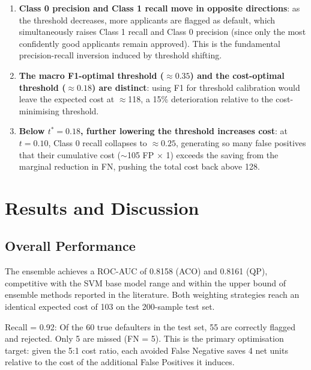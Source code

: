 \documentclass[12pt,a4paper]{article}
\begin{document}
\begin{enumerate}
    \item \textbf{Class 0 precision and Class 1 recall move in opposite
    directions}: as the threshold decreases, more applicants are flagged as
    default, which simultaneously raises Class 1 recall and Class 0 precision
    (since only the most confidently good applicants remain approved). This
    is the fundamental precision-recall inversion induced by threshold shifting.

    \item \textbf{The macro F1-optimal threshold ($\approx 0.35$) and the
    cost-optimal threshold ($\approx 0.18$) are distinct}: using F1 for
    threshold calibration would leave the expected cost at $\approx$118, a
    15\% deterioration relative to the cost-minimising threshold.

    \item \textbf{Below $t^* = 0.18$, further lowering the threshold increases
    cost}: at $t = 0.10$, Class 0 recall collapses to $\approx 0.25$, generating
    so many false positives that their cumulative cost ($\sim$105 FP $\times$ 1)
    exceeds the saving from the marginal reduction in FN, pushing the total cost
    back above 128.
\end{enumerate}

\pagebreak
\section{Results and Discussion}

\subsection{Overall Performance}

The ensemble achieves a ROC-AUC of 0.8158 (ACO) and 0.8161 (QP), competitive with the SVM base model range and within the upper bound of ensemble methods reported in the literature. Both weighting strategies reach an identical expected cost of 103 on the 200-sample test set.
\item Recall = 0.92: Of the 60 true defaulters in the test set, 55 are correctly flagged
and rejected. Only 5 are missed (FN = 5). This is the primary optimisation target:
given the 5:1 cost ratio, each avoided False Negative saves 4 net units relative to
the cost of the additional False Positives it induces.
\end{document}
